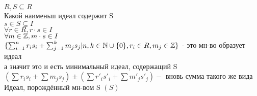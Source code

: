 $ R, S \subseteq R $ \\
Какой наименьш идеал содержит S \\
$ s \in S \subseteq I $ \\
$ \forall r \in R, r \cdot s \in I $\\
$ \forall m \in \mathbb{Z}, m \cdot s \in I $ \\
$ \{ \sum_{i=1}^{n} r_is_i + \sum_{j=1}^{k} m_js_j | n, k \in \mathbb{N} \cup \{0\}, r_i \in R, m_j \in \mathbb{Z} \} $ - это мн-во образует идеал \\
а значит это и есть минимальный идеал, содержащий S \\
$ (\sum r_is_i + \sum m_js_j) \pm  (\sum r'_is'_i + \sum m'_js'_j) - $ вновь сумма такого же вида \\
Идеал, порождённый мн-вом S $ (S) $ \\













